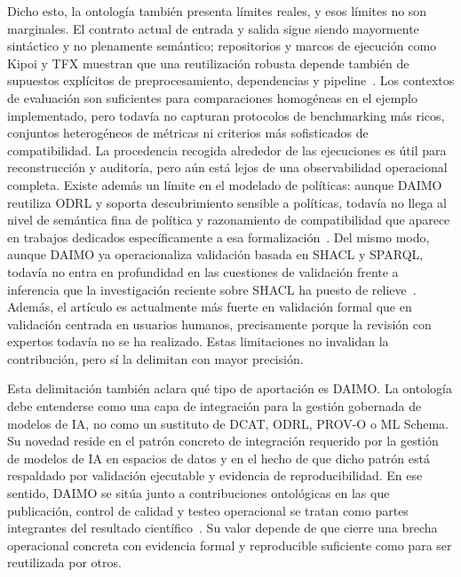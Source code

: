 \documentclass[11pt,a4paper]{article}
\begin{document}
Dicho esto, la ontología también presenta límites reales, y esos límites no son marginales. El contrato actual de entrada y salida sigue siendo mayormente sintáctico y no plenamente semántico; repositorios y marcos de ejecución como Kipoi y TFX muestran que una reutilización robusta depende también de supuestos explícitos de preprocesamiento, dependencias y pipeline~\cite{kipoi,tfx}. Los contextos de evaluación son suficientes para comparaciones homogéneas en el ejemplo implementado, pero todavía no capturan protocolos de benchmarking más ricos, conjuntos heterogéneos de métricas ni criterios más sofisticados de compatibilidad. La procedencia recogida alrededor de las ejecuciones es útil para reconstrucción y auditoría, pero aún está lejos de una observabilidad operacional completa. Existe además un límite en el modelado de políticas: aunque DAIMO reutiliza ODRL y soporta descubrimiento sensible a políticas, todavía no llega al nivel de semántica fina de política y razonamiento de compatibilidad que aparece en trabajos dedicados específicamente a esa formalización~\cite{pandit-esteves}. Del mismo modo, aunque DAIMO ya operacionaliza validación basada en SHACL y SPARQL, todavía no entra en profundidad en las cuestiones de validación frente a inferencia que la investigación reciente sobre SHACL ha puesto de relieve~\cite{ferranti,robaldo}. Además, el artículo es actualmente más fuerte en validación formal que en validación centrada en usuarios humanos, precisamente porque la revisión con expertos todavía no se ha realizado. Estas limitaciones no invalidan la contribución, pero sí la delimitan con mayor precisión.

Esta delimitación también aclara qué tipo de aportación es DAIMO. La ontología debe entenderse como una capa de integración para la gestión gobernada de modelos de IA, no como un sustituto de DCAT, ODRL, PROV-O o ML Schema. Su novedad reside en el patrón concreto de integración requerido por la gestión de modelos de IA en espacios de datos y en el hecho de que dicho patrón está respaldado por validación ejecutable y evidencia de reproducibilidad. En ese sentido, DAIMO se sitúa junto a contribuciones ontológicas en las que publicación, control de calidad y testeo operacional se tratan como partes integrantes del resultado científico~\cite{penteado23,bareedu24,ferranti}. Su valor depende de que cierre una brecha operacional concreta con evidencia formal y reproducible suficiente como para ser reutilizada por otros.

\end{document}

